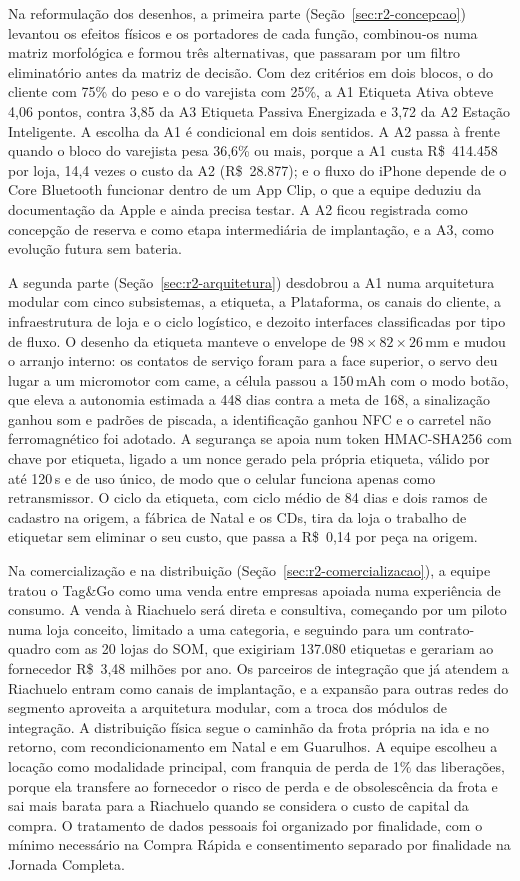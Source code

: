 Na reformulação dos desenhos, a primeira parte (Seção~\ref{sec:r2-concepcao}) levantou os efeitos físicos e os portadores de cada função, combinou-os numa matriz morfológica e formou três alternativas, que passaram por um filtro eliminatório antes da matriz de decisão. Com dez critérios em dois blocos, o do cliente com 75\% do peso e o do varejista com 25\%, a A1 Etiqueta Ativa obteve 4,06 pontos, contra 3,85 da A3 Etiqueta Passiva Energizada e 3,72 da A2 Estação Inteligente. A escolha da A1 é condicional em dois sentidos. A A2 passa à frente quando o bloco do varejista pesa 36,6\% ou mais, porque a A1 custa R\$~414.458 por loja, 14,4 vezes o custo da A2 (R\$~28.877); e o fluxo do iPhone depende de o Core Bluetooth funcionar dentro de um App Clip, o que a equipe deduziu da documentação da Apple e ainda precisa testar. A A2 ficou registrada como concepção de reserva e como etapa intermediária de implantação, e a A3, como evolução futura sem bateria.

A segunda parte (Seção~\ref{sec:r2-arquitetura}) desdobrou a A1 numa arquitetura modular com cinco subsistemas, a etiqueta, a Plataforma, os canais do cliente, a infraestrutura de loja e o ciclo logístico, e dezoito interfaces classificadas por tipo de fluxo. O desenho da etiqueta manteve o envelope de $98 \times 82 \times 26$\,mm e mudou o arranjo interno: os contatos de serviço foram para a face superior, o servo deu lugar a um micromotor com came, a célula passou a 150\,mAh com o modo botão, que eleva a autonomia estimada a 448 dias contra a meta de 168, a sinalização ganhou som e padrões de piscada, a identificação ganhou NFC e o carretel não ferromagnético foi adotado. A segurança se apoia num token HMAC-SHA256 com chave por etiqueta, ligado a um nonce gerado pela própria etiqueta, válido por até 120\,s e de uso único, de modo que o celular funciona apenas como retransmissor. O ciclo da etiqueta, com ciclo médio de 84 dias e dois ramos de cadastro na origem, a fábrica de Natal e os CDs, tira da loja o trabalho de etiquetar sem eliminar o seu custo, que passa a R\$~0,14 por peça na origem.

Na comercialização e na distribuição (Seção~\ref{sec:r2-comercializacao}), a equipe tratou o Tag\&Go como uma venda entre empresas apoiada numa experiência de consumo. A venda à Riachuelo será direta e consultiva, começando por um piloto numa loja conceito, limitado a uma categoria, e seguindo para um contrato-quadro com as 20 lojas do SOM, que exigiriam 137.080 etiquetas e gerariam ao fornecedor R\$~3,48 milhões por ano. Os parceiros de integração que já atendem a Riachuelo entram como canais de implantação, e a expansão para outras redes do segmento aproveita a arquitetura modular, com a troca dos módulos de integração. A distribuição física segue o caminhão da frota própria na ida e no retorno, com recondicionamento em Natal e em Guarulhos. A equipe escolheu a locação como modalidade principal, com franquia de perda de 1\% das liberações, porque ela transfere ao fornecedor o risco de perda e de obsolescência da frota e sai mais barata para a Riachuelo quando se considera o custo de capital da compra. O tratamento de dados pessoais foi organizado por finalidade, com o mínimo necessário na Compra Rápida e consentimento separado por finalidade na Jornada Completa.

